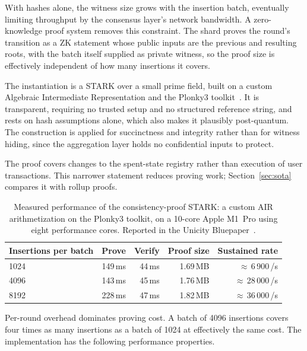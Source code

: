 With hashes alone, the witness size grows with the insertion batch, eventually limiting throughput by the consensus layer's network bandwidth. A zero-knowledge proof system removes this constraint. The shard proves the round's transition as a ZK statement whose public inputs are the previous and resulting roots, with the batch itself supplied as private witness, so the proof size is effectively independent of how many insertions it covers.

The instantiation is a STARK over a small prime field, built on a custom Algebraic Intermediate Representation and the Plonky3 toolkit~\cite{plonky3}. It is transparent, requiring no trusted setup and no structured reference string, and rests on hash assumptions alone, which also makes it plausibly post-quantum. The construction is applied for succinctness and integrity rather than for witness hiding, since the aggregation layer holds no confidential inputs to protect.

The proof covers changes to the spent-state registry rather than execution of user transactions. This narrower statement reduces proving work; Section~\ref{sec:sota} compares it with rollup proofs.

\begin{table}[ht]
    \centering
    \caption{Measured performance of the consistency-proof STARK: a custom AIR arithmetization on the Plonky3 toolkit, on a 10-core Apple M1~Pro using eight performance cores. Reported in the Unicity Bluepaper~\cite{bluepaper}.}
    \label{tab:perf}
    \begin{tabular}{@{}lrrrr@{}}
        \toprule
        \textbf{Insertions per batch} & \textbf{Prove} & \textbf{Verify} & \textbf{Proof size} & \textbf{Sustained rate} \\
        \midrule
        1024 & 149\,ms & 44\,ms & 1.69\,MB & $\approx$\,6\,900\,/s \\
        4096 & 143\,ms & 45\,ms & 1.76\,MB & $\approx$\,28\,000\,/s \\
        8192 & 228\,ms & 47\,ms & 1.82\,MB & $\approx$\,36\,000\,/s \\
        \bottomrule
    \end{tabular}
\end{table}

Per-round overhead dominates proving cost. A batch of 4096 insertions covers four times as many insertions as a batch of 1024 at effectively the same cost. The implementation has the following performance properties.


